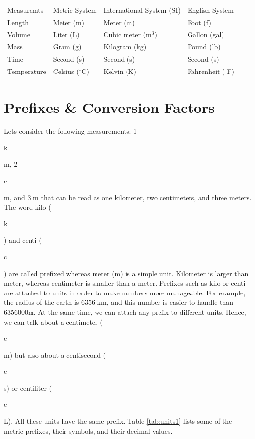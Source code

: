 \documentclass[main.tex]{subfiles}
\begin{document}
 \label{tab:units1}
\selectfont
\begin{tabular}{llll}
\rowcolor{black!45}
\toprule
\multicolumn{4}{l}{\hypersetup{colorlinks,linkcolor={white}} \cellcolor{black}\color{white}\bfseries\small Table \ref{tab:units1} Different unit systems } \\
\midrule
Measuremts & Metric System & International System (SI)& English System \\
\midrule
Length & Meter (m) & Meter (m)& Foot (f)\\
 Volume & Liter (L)  &  Cubic meter ($\text{m}^3$)& Gallon (gal) \\
   Mass & Gram (g)  &  Kilogram (kg)& Pound (lb)\\
  Time&  Second (s) & Second (s) &Second (s)  \\
 Temperature &Celsius ($^{\circ}$C)   & Kelvin (K)& Fahrenheit ($^{\circ}$F)  \\
\bottomrule
\end{tabular}

\section{Prefixes \& Conversion Factors}


Let\textquotesingle s consider the following measurements: 1 \begin{bf}k\end{bf}m, 2 \begin{bf}c\end{bf}m, and 3 m that can be read as one kilometer, two centimeters, and three meters. The word kilo (\begin{bf}k\end{bf}) and centi (\begin{bf}c\end{bf}) are called prefixed whereas meter (m) is a simple unit. Kilometer is larger than meter, whereas centimeter is smaller than a meter. Prefixes such as kilo or centi are attached to units in order to make numbers more manageable. For example, the radius of the earth is 6356 km, and this number is easier to handle than 6356000m. At the same time, we can attach any prefix to different units. Hence, we can talk about a centimeter (\begin{bf}c\end{bf}m) but also about a centisecond (\begin{bf}c\end{bf}s) or centiliter (\begin{bf}c\end{bf}L). All these units have the same prefix. Table \ref{tab:units1} lists some of the metric prefixes, their symbols, and their decimal values.
\end{document}
